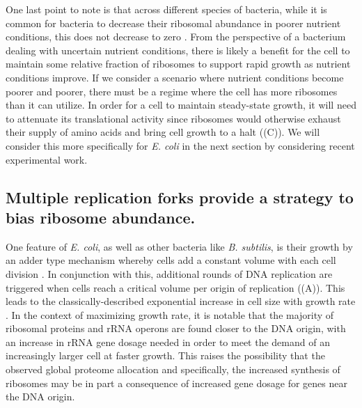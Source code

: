 One last point to note is that across different species of bacteria, while it is
common for bacteria to decrease their ribosomal abundance in poorer nutrient
conditions, this does not decrease to zero \cite{scott2010, liebermeister2014}.
From the perspective of a bacterium dealing with uncertain nutrient conditions,
there is likely a benefit for the cell to maintain some relative fraction of
ribosomes to support rapid growth as nutrient conditions improve. If we consider
a scenario where nutrient conditions become poorer and poorer, there must be a
regime where the cell has more ribosomes than it can utilize. In order for a
cell to maintain steady-state growth, it will need to attenuate its
translational activity since ribosomes would otherwise exhaust their supply of
amino acids and bring cell growth to a halt ((C)). We will
consider this more specifically for \textit{E. coli} in the next section by considering
recent experimental work.


\subsection{Multiple replication forks provide a strategy to bias ribosome abundance.}

One feature of \textit{E. coli}, as well as other bacteria like \textit{B.
subtilis}, is their growth by an adder type mechanism whereby cells add a
constant volume with each cell division \citep{taheriaraghi2015}. In conjunction
with this, additional rounds of DNA replication are triggered when cells reach a
critical volume per origin of replication ((A)). This
leads to the classically-described exponential increase in cell size with growth
rate \cite{schaechter1958, si2017, si2019}. In the context of maximizing growth
rate, it is notable that the majority of ribosomal proteins and rRNA operons are
found closer to the DNA origin, with an increase in rRNA gene dosage needed in
order to meet the demand of an increasingly larger cell at faster growth. This
raises the possibility that the observed global proteome allocation and
specifically, the increased synthesis of ribosomes may be in part a
consequence of increased gene dosage for genes near the DNA origin.


